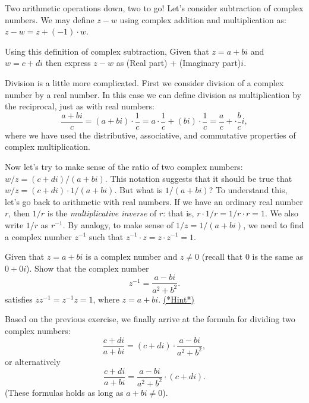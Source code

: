 Two arithmetic operations down, two to go!  Let's consider subtraction of complex numbers. We may define $z - w$ using complex addition and multiplication as:  $z - w = z + (-1)\cdot w$.

\begin{exercise}
Using this definition of complex subtraction, Given that  $z = a + bi$ and $w = c + di$ then express $z - w$ as (Real part)  + (Imaginary part)$i$.
\end{exercise}

Division is a little more complicated. First we consider division of a complex number by a real number.  In this case we can define division as multiplication by the reciprocal, just as with real numbers:
\begin{equation}\label{eq:complex:1}
\frac{a + bi}{c} = (a + bi) \cdot \frac{1}{c} = a \cdot \frac{1}{c} + (bi) \cdot \frac{1}{c} = \frac{a}{c} + \cdot \frac{b}{c}i , 
\end{equation}
where we have used the distributive, associative, and commutative properties of complex multiplication. 

Now let's try to make sense of the ratio of two complex numbers: $w/z=(c+di) / (a+bi)$. This notation suggests that it should be true that  $w/z = (c+di) \cdot 1/(a+bi)$. But what is $1/(a+bi)$?
To understand this, let's go back to arithmetic with real numbers. If we have an ordinary real number $r$, then $1/r$ is the \emph{multiplicative inverse} of $r$: that is, $r \cdot 1/r =1/r \cdot r = 1$. We also write $1/r$ as $r^{-1}$. By analogy, to make sense of $1/z = 1/(a+bi)$, we need to find a complex number $z^{-1}$ such that $z^{-1} \cdot z = z \cdot z^{-1} = 1$.

\begin{exercise}\label{exercise:complex:complex_mult_inv}  Given that $z = a+bi$ is a complex number and $z \neq 0$ (recall that $0$ is the same as $0+0i$).  Show that the complex number
\[ z^{-1}=\frac{a-bi}{a^{2}+b^{2}}.\]
satisfies $zz^{-1}=z^{-1}z=1$, where $z=a+bi$.
\hyperref[sec:complex:hints]{(*Hint*)}
\end{exercise}
Based on the previous exercise, we finally arrive at the formula for dividing two complex numbers:
\[\frac{c+di}{a+bi}=
(c + di) \cdot \frac{a-bi}{a^2 + b^2}, \]
or alternatively
\[\frac{c+di}{a+bi}=  \frac{a-bi}{a^2 + b^2} \cdot (c + di).\]
(These formulas holds as long as $a+bi \neq 0$). 


